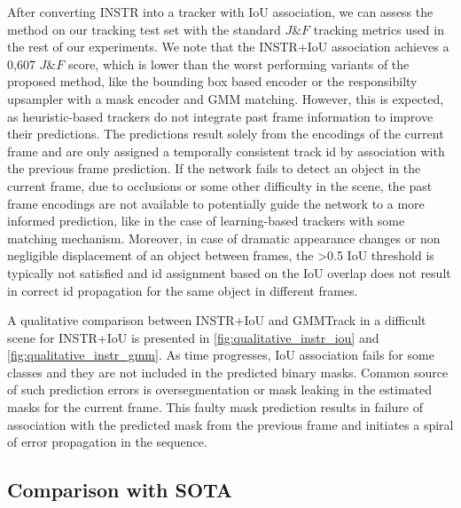  
After converting INSTR into a tracker with IoU association, we can assess the method on our tracking test set with the standard $J\&F$ tracking metrics used in the rest of our experiments. We note that the INSTR+IoU association achieves a 0,607 $J\&F$ score, which is lower than the worst performing variants of the proposed method, like the bounding box based encoder or the responsibilty upsampler with a mask encoder and GMM matching. However, this is expected, as heuristic-based trackers do not integrate past frame information to improve their predictions. The predictions result solely from the encodings of the current frame and are only assigned a temporally consistent track id by association with the previous frame prediction. If the network fails to detect an object in the current frame, due to occlusions or some other difficulty in the scene, the past frame encodings are not available to potentially guide the network to a more informed prediction, like in the case of learning-based trackers with some matching mechanism. Moreover, in case of dramatic appearance changes or non negligible displacement of an object between frames, the >0.5 IoU threshold is typically not satisfied and id assignment based on the IoU overlap does not result in correct id propagation for the same object in different frames.  \par

A qualitative comparison between INSTR+IoU and GMMTrack in a difficult scene for INSTR+IoU is presented in \figref\ref{fig:qualitative_instr_iou} and \figref\ref{fig:qualitative_instr_gmm}. As time progresses, IoU association fails for some classes and they are not included in the predicted binary masks. Common source of such prediction errors is oversegmentation or mask leaking in the estimated masks for the current frame. This faulty mask prediction results in failure of association with the predicted mask from the previous frame and initiates a spiral of error propagation in the sequence.


\subsection{Comparison with SOTA}


